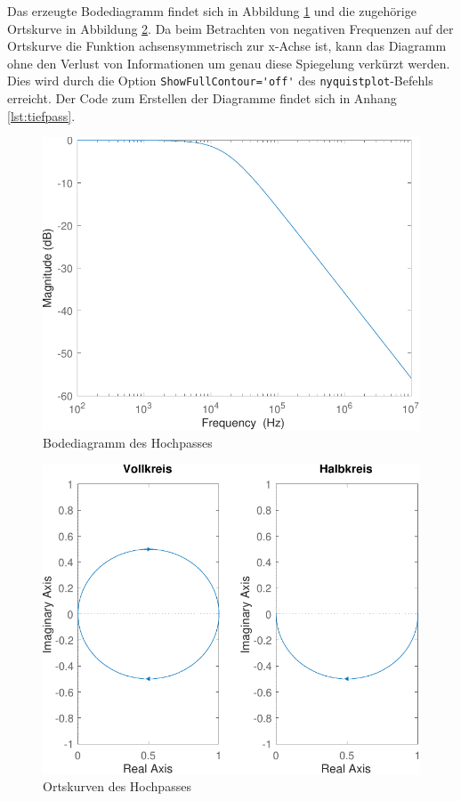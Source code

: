 \documentclass[
    paper=a4,
    fontsize=10pt,
    DIV=12,
    oneside,
]{scrartcl}
\begin{document}
    Das erzeugte Bodediagramm findet sich in Abbildung \ref{fig:bode} und die zugehörige Ortskurve in Abbildung \ref{fig:ortskurve}. Da beim Betrachten von negativen Frequenzen auf der Ortskurve die Funktion achsensymmetrisch zur x-Achse ist, kann das Diagramm ohne den Verlust von Informationen um genau diese Spiegelung verkürzt werden. Dies wird durch die Option \verb|ShowFullContour='off'| des \verb|nyquistplot|-Befehls erreicht. Der Code zum Erstellen der Diagramme findet sich in Anhang \ref{lst:tiefpass}.

    \begin{figure}[hbt]
        \centering
        \includegraphics[width=0.7\imagewidth]{../versuch1/bode}
        \caption{Bodediagramm des Hochpasses}
        \label{fig:bode}
    \end{figure}

    \begin{figure}
        \centering
        \includegraphics[width=0.7\imagewidth]{../versuch1/ortskurve}
        \caption{Ortskurven des Hochpasses}
        \label{fig:ortskurve}
    \end{figure}
\end{document}
